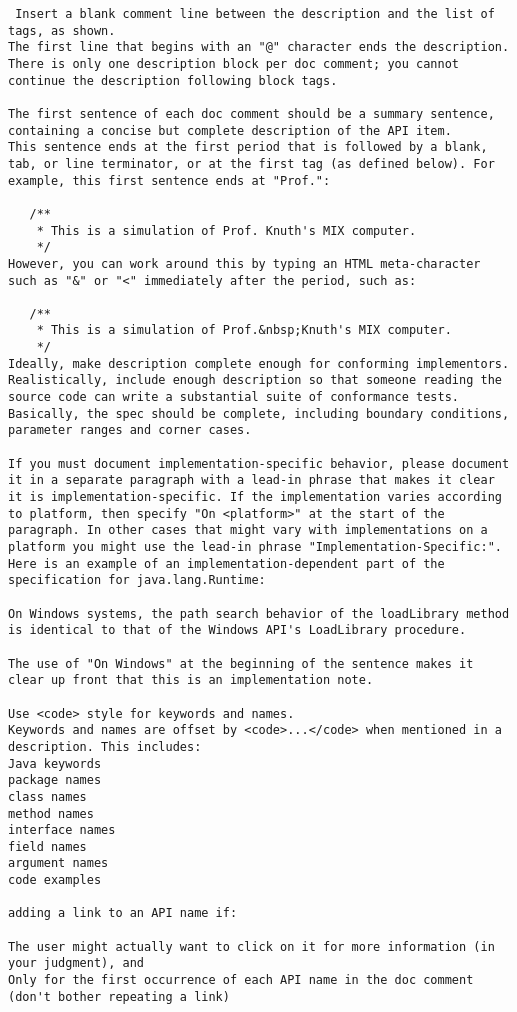 \begin{lstlisting}
 Insert a blank comment line between the description and the list of tags, as shown.
The first line that begins with an "@" character ends the description. There is only one description block per doc comment; you cannot continue the description following block tags.

The first sentence of each doc comment should be a summary sentence, containing a concise but complete description of the API item.
This sentence ends at the first period that is followed by a blank, tab, or line terminator, or at the first tag (as defined below). For example, this first sentence ends at "Prof.":

   /**
    * This is a simulation of Prof. Knuth's MIX computer.
    */
However, you can work around this by typing an HTML meta-character such as "&" or "<" immediately after the period, such as:

   /**
    * This is a simulation of Prof.&nbsp;Knuth's MIX computer.
    */
Ideally, make description complete enough for conforming implementors. Realistically, include enough description so that someone reading the source code can write a substantial suite of conformance tests. Basically, the spec should be complete, including boundary conditions, parameter ranges and corner cases.
	
If you must document implementation-specific behavior, please document it in a separate paragraph with a lead-in phrase that makes it clear it is implementation-specific. If the implementation varies according to platform, then specify "On <platform>" at the start of the paragraph. In other cases that might vary with implementations on a platform you might use the lead-in phrase "Implementation-Specific:". Here is an example of an implementation-dependent part of the specification for java.lang.Runtime:

On Windows systems, the path search behavior of the loadLibrary method is identical to that of the Windows API's LoadLibrary procedure.

The use of "On Windows" at the beginning of the sentence makes it clear up front that this is an implementation note.

Use <code> style for keywords and names. 
Keywords and names are offset by <code>...</code> when mentioned in a description. This includes:
Java keywords
package names
class names
method names
interface names
field names
argument names
code examples

adding a link to an API name if:

The user might actually want to click on it for more information (in your judgment), and
Only for the first occurrence of each API name in the doc comment (don't bother repeating a link)


\end{lstlisting}
